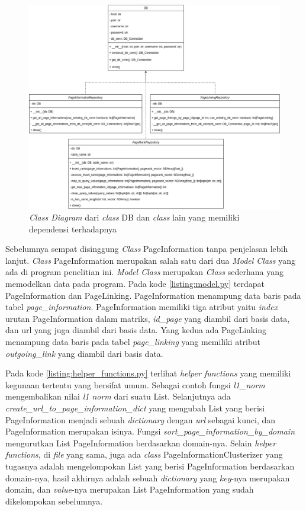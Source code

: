 \begin{figure}[H]
  \centering
  \includegraphics[keepaspectratio, width={\textwidth}]{gambar/db_class_diagram}
  \caption{\textit{Class Diagram} dari \textit{class} DB dan \textit{class} lain yang memiliki dependensi terhadapnya}
	\label{gambar:db_class_diagram}
\end{figure}

Sebelumnya sempat disinggung \textit{Class} PageInformation tanpa penjelasan lebih lanjut. \textit{Class} PageInformation merupakan salah satu dari dua \textit{Model Class} yang ada di program penelitian ini. \textit{Model Class} merupakan \textit{Class} sederhana yang memodelkan data pada program. Pada kode \ref{listing:model.py} terdapat PageInformation dan PageLinking. PageInformation menampung data baris pada tabel \textit{page\_information}. PageInformation memiliki tiga atribut yaitu \textit{index} urutan PageInformation dalam matriks, \textit{id\_page} yang diambil dari basis data, dan url yang juga diambil dari basis data. Yang kedua ada PageLinking menampung data baris pada tabel \textit{page\_linking} yang memiliki atribut \textit{outgoing\_link} yang diambil dari basis data.

Pada kode \ref{listing:helper_functions.py} terlihat \textit{helper functions} yang memiliki kegunaan tertentu yang bersifat umum. Sebagai contoh fungsi \textit{l1\_norm} mengembalikan nilai \textit{l1 norm} dari suatu List. Selanjutnya ada \textit{create\_url\_to\_page\_information\_dict} yang mengubah List yang berisi PageInformation menjadi sebuah \textit{dictionary} dengan \textit{url} sebagai kunci, dan PageInformation merupakan isinya. Fungsi \textit{sort\_page\_information\_by\_domain} mengurutkan List PageInformation berdasarkan domain-nya. Selain \textit{helper functions}, di \textit{file} yang sama, juga ada \textit{class} PageInformationClusterizer yang tugasnya adalah mengelompokan List yang berisi PageInformation berdasarkan domain-nya, hasil akhirnya adalah sebuah \textit{dictionary} yang \textit{key}-nya merupakan domain, dan \textit{value}-nya merupakan List PageInformation yang sudah dikelompokan sebelumnya.

